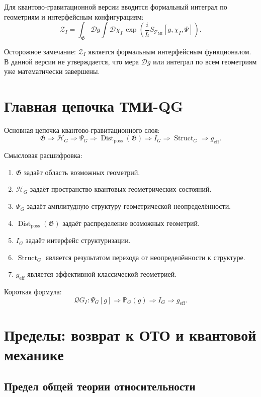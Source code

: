 \documentclass[12pt,a4paper]{article}
\DeclareMathOperator{\Struct}{Struct}
\DeclareMathOperator{\Dist}{Dist}
\newcommand{\TMI}{\mathcal T_{\mathrm{MI}}}
\newcommand{\QGI}{\mathcal QG_I}
\newcommand{\Gspace}{\mathfrak G}
\newcommand{\Hilb}{\mathcal H}
\newcommand{\Prob}{\mathbb P}
\newcommand{\Eff}{\mathrm{eff}}
\newcommand{\D}{\mathcal D}
\begin{document}
Для квантово-гравитационной версии вводится формальный интеграл по геометриям и интерфейсным конфигурациям:
\[
\boxed{
\mathcal Z_I
=
\int_{\Gspace}\D g
\int \D\chi_I\,
\exp\left(\frac{i}{\hbar}S_{\TMI}[g,\chi_I,\Psi]\right).
}
\]

Осторожное замечание: $\mathcal Z_I$ является формальным интерфейсным функционалом. В данной версии не утверждается, что мера $\D g$ или интеграл по всем геометриям уже математически завершены.

\section{Главная цепочка ТМИ-QG}

Основная цепочка квантово-гравитационного слоя:
\[
\boxed{
\Gspace
\Rightarrow
\Hilb_G
\Rightarrow
\Psi_G
\Rightarrow
\Dist_{\mathrm{poss}}(\Gspace)
\Rightarrow
I_G
\Rightarrow
\Struct_G
\Rightarrow
 g_{\Eff}.
}
\]

Смысловая расшифровка:
\begin{enumerate}[leftmargin=2em]
    \item $\Gspace$ задаёт область возможных геометрий.
    \item $\Hilb_G$ задаёт пространство квантовых геометрических состояний.
    \item $\Psi_G$ задаёт амплитудную структуру геометрической неопределённости.
    \item $\Dist_{\mathrm{poss}}(\Gspace)$ задаёт распределение возможных геометрий.
    \item $I_G$ задаёт интерфейс структуризации.
    \item $\Struct_G$ является результатом перехода от неопределённости к структуре.
    \item $g_{\Eff}$ является эффективной классической геометрией.
\end{enumerate}

Короткая формула:
\[
\boxed{
\QGI:
\Psi_G[g]
\Rightarrow
\Prob_G(g)
\Rightarrow
I_G
\Rightarrow
 g_{\Eff}.
}
\]

\section{Пределы: возврат к ОТО и квантовой механике}

\subsection{Предел общей теории относительности}
\end{document}
